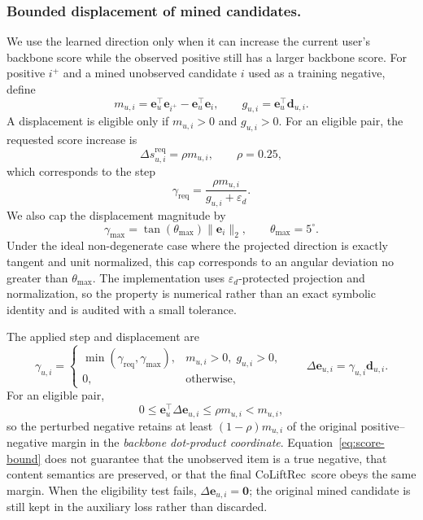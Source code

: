 \documentclass[sigconf,anonymous,review]{acmart}
\newcommand{\methodname}{CoLiftRec}
\begin{document}
\subsubsection{Bounded displacement of mined candidates.}
We use the learned direction only when it can increase the current user's backbone score while the observed positive still has a larger backbone score.
For positive $i^+$ and a mined unobserved candidate $i$ used as a training negative, define
\begin{equation}
    m_{u,i}
    =
    \mathbf{e}_u^{\top}\mathbf{e}_{i^+}
    -
    \mathbf{e}_u^{\top}\mathbf{e}_{i},
    \qquad
    g_{u,i}
    =
    \mathbf{e}_u^{\top}\mathbf{d}_{u,i}.
\end{equation}
A displacement is eligible only if $m_{u,i}>0$ and $g_{u,i}>0$.
For an eligible pair, the requested score increase is
\begin{equation}
    \Delta s_{u,i}^{\mathrm{req}}
    =
    \rho m_{u,i},
    \qquad
    \rho=0.25,
\end{equation}
which corresponds to the step
\begin{equation}
    \gamma_{\mathrm{req}}
    =
    \frac{\rho m_{u,i}}
    {g_{u,i}+\varepsilon_d}.
\end{equation}
We also cap the displacement magnitude by
\begin{equation}
    \gamma_{\max}
    =
    \tan(\theta_{\max})\|\mathbf{e}_i\|_2,
    \qquad
    \theta_{\max}=5^{\circ}.
\end{equation}
Under the ideal non-degenerate case where the projected direction is exactly tangent and unit normalized, this cap corresponds to an angular deviation no greater than $\theta_{\max}$.
The implementation uses $\varepsilon_d$-protected projection and normalization, so the property is numerical rather than an exact symbolic identity and is audited with a small tolerance.

The applied step and displacement are
\begin{equation}
    \gamma_{u,i}
    =
    \begin{cases}
      \min(\gamma_{\mathrm{req}},\gamma_{\max}),
      & m_{u,i}>0,\;g_{u,i}>0,\\
      0, & \text{otherwise},
    \end{cases}
    \qquad
    \Delta\mathbf{e}_{u,i}
    =
    \gamma_{u,i}\mathbf{d}_{u,i}.
    \label{eq:bounded-delta}
\end{equation}
For an eligible pair,
\begin{equation}
    0
    \leq
    \mathbf{e}_u^{\top}\Delta\mathbf{e}_{u,i}
    \leq
    \rho m_{u,i}
    <
    m_{u,i},
    \label{eq:score-bound}
\end{equation}
so the perturbed negative retains at least $(1-\rho)m_{u,i}$ of the original positive--negative margin in the \emph{backbone dot-product coordinate}.
Equation~\eqref{eq:score-bound} does not guarantee that the unobserved item is a true negative, that content semantics are preserved, or that the final \methodname\ score obeys the same margin.
When the eligibility test fails, $\Delta\mathbf{e}_{u,i}=\mathbf{0}$; the original mined candidate is still kept in the auxiliary loss rather than discarded.
\end{document}
